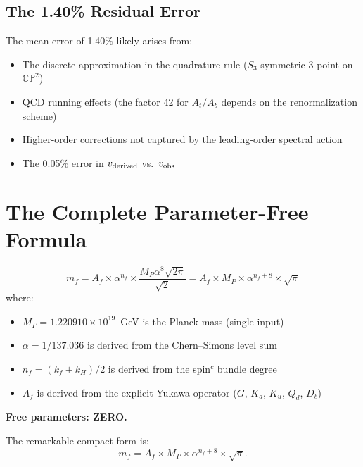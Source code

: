 \documentclass[11pt,a4paper]{article}
\newcommand{\CP}{\mathbb{CP}}
\theoremstyle{definition}
\theoremstyle{remark}
\begin{document}
\subsection{The 1.40\% Residual Error}

The mean error of 1.40\% likely arises from:
\begin{itemize}
\item The discrete approximation in the quadrature rule
  ($S_3$-symmetric 3-point on $\CP^2$)
\item QCD running effects (the factor 42 for $A_t/A_b$ depends on
  the renormalization scheme)
\item Higher-order corrections not captured by the leading-order
  spectral action
\item The 0.05\% error in $v_{\rm derived}$ vs.\ $v_{\rm obs}$
\end{itemize}

\section{The Complete Parameter-Free Formula}
\label{sec:formula}

\begin{tcolorbox}[colback=yellow!5!white, colframe=orange!60!black,
  title={DFD Parameter-Free Fermion Mass Formula}]
\begin{equation}
\boxed{m_f = A_f \times \alpha^{n_f} \times \frac{M_P\alpha^8\sqrt{2\pi}}{\sqrt{2}}
= A_f \times M_P \times \alpha^{n_f + 8} \times \sqrt{\pi}}
\end{equation}
where:
\begin{itemize}
\item $M_P = 1.220910 \times 10^{19}$~GeV is the Planck mass (single input)
\item $\alpha = 1/137.036$ is derived from the Chern--Simons level sum
\item $n_f = (k_f + k_H)/2$ is derived from the spin$^c$ bundle degree
\item $A_f$ is derived from the explicit Yukawa operator ($G$, $K_d$, $K_u$, $Q_d$, $D_\ell$)
\end{itemize}

\textbf{Free parameters: ZERO.}
\end{tcolorbox}

The remarkable compact form is:
\begin{equation}
m_f = A_f \times M_P \times \alpha^{n_f + 8} \times \sqrt{\pi}.
\end{equation}
\end{document}
